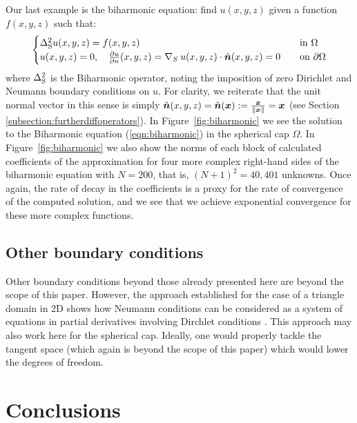 \documentclass[11pt, oneside]{article}   	%
\begin{document}
Our last example is the biharmonic equation: find $u(x,y,z)$ given a function $f(x,y,z)$ such that:
\begin{align}
	\begin{cases}
    		\Delta_{\rm S}^2 u(x,y,z) = f(x,y,z) &\quad \text{in } \Omega \\
		u(x,y,z) = 0, \quad \frac{\partial u}{\partial n}(x,y,z) = \nabla_S \: u(x,y,z) \cdot \hat{\bm{n}}(x,y,z) = 0 &\quad \text{on } \partial \Omega
	\end{cases}
	\label{eqn:biharmonic}
\end{align}
where $\Delta_{\rm S}^2$ is the Biharmonic operator, noting the imposition of zero Dirichlet and Neumann boundary conditions on $u$. For clarity, we reiterate that the unit normal vector in this sense is simply $\hat{\bm{n}}(x,y,z) = \hat{\bm{n}}(\bm{x}) := {\bm{x} \over \left\| \bm{x} \right\|} = \bm{x}$ (see Section \ref{subsection:furtherdiffoperators}). In Figure~\ref{fig:biharmonic} we see the solution to the Biharmonic equation (\ref{eqn:biharmonic}) in the spherical cap $\Omega$. In Figure~\ref{fig:biharmonic} we also show the norms of each block of calculated coefficients of the approximation for four more complex right-hand sides of the biharmonic equation with $N = 200$, that is, $(N+1)^2 = 40,401$ unknowns. Once again, the rate of decay in the coefficients is a proxy for the rate of convergence of the computed solution, and we see that we achieve exponential convergence for these more complex functions.


\subsection{Other boundary conditions}

Other boundary conditions beyond those already presented here are beyond the scope of this paper. However, the approach established for the case of a triangle domain in 2D shows how Neumann conditions can be considered  as a system of equations in partial derivatives involving Dirchlet conditions \cite{olver2019triangle}. This approach may also work here for the spherical cap. Ideally, one would properly tackle the tangent space (which again is beyond the scope of this paper) which would lower the degrees of freedom.



%
\section{Conclusions}
\end{document}
